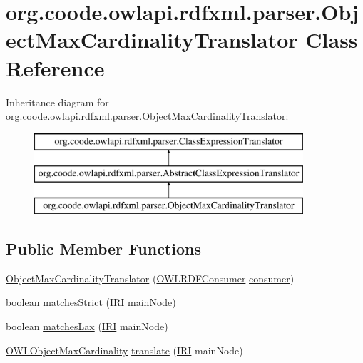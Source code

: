 \hypertarget{classorg_1_1coode_1_1owlapi_1_1rdfxml_1_1parser_1_1_object_max_cardinality_translator}{\section{org.\-coode.\-owlapi.\-rdfxml.\-parser.\-Object\-Max\-Cardinality\-Translator Class Reference}
\label{classorg_1_1coode_1_1owlapi_1_1rdfxml_1_1parser_1_1_object_max_cardinality_translator}
}
Inheritance diagram for org.\-coode.\-owlapi.\-rdfxml.\-parser.\-Object\-Max\-Cardinality\-Translator\-:\begin{figure}[H]
\begin{center}
\leavevmode
\includegraphics[height=3.000000cm]{classorg_1_1coode_1_1owlapi_1_1rdfxml_1_1parser_1_1_object_max_cardinality_translator}
\end{center}
\end{figure}
\subsection*{Public Member Functions}
\begin{DoxyCompactItemize}
\item 
\hyperlink{classorg_1_1coode_1_1owlapi_1_1rdfxml_1_1parser_1_1_object_max_cardinality_translator_a438ee256c5723f176511943db3373bb2}{Object\-Max\-Cardinality\-Translator} (\hyperlink{classorg_1_1coode_1_1owlapi_1_1rdfxml_1_1parser_1_1_o_w_l_r_d_f_consumer}{O\-W\-L\-R\-D\-F\-Consumer} \hyperlink{classorg_1_1coode_1_1owlapi_1_1rdfxml_1_1parser_1_1_abstract_class_expression_translator_ae547084cdd5b92c03835b5aa404f823b}{consumer})
\item 
boolean \hyperlink{classorg_1_1coode_1_1owlapi_1_1rdfxml_1_1parser_1_1_object_max_cardinality_translator_a9dd004882be85dcf665c7109ed68a8ab}{matches\-Strict} (\hyperlink{classorg_1_1semanticweb_1_1owlapi_1_1model_1_1_i_r_i}{I\-R\-I} main\-Node)
\item 
boolean \hyperlink{classorg_1_1coode_1_1owlapi_1_1rdfxml_1_1parser_1_1_object_max_cardinality_translator_ab3ec969c06e957534b8fb7d1b94ae25b}{matches\-Lax} (\hyperlink{classorg_1_1semanticweb_1_1owlapi_1_1model_1_1_i_r_i}{I\-R\-I} main\-Node)
\item 
\hyperlink{interfaceorg_1_1semanticweb_1_1owlapi_1_1model_1_1_o_w_l_object_max_cardinality}{O\-W\-L\-Object\-Max\-Cardinality} \hyperlink{classorg_1_1coode_1_1owlapi_1_1rdfxml_1_1parser_1_1_object_max_cardinality_translator_a565b099bcce7279f69474c8cbc84c44d}{translate} (\hyperlink{classorg_1_1semanticweb_1_1owlapi_1_1model_1_1_i_r_i}{I\-R\-I} main\-Node)
\end{DoxyCompactItemize}
